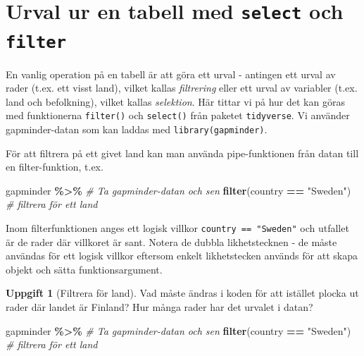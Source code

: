 \documentclass[
]{book}
\newenvironment{Shaded}{\begin{snugshade}}{\end{snugshade}}
\newcommand{\CommentTok}[1]{\textcolor[rgb]{0.56,0.35,0.01}{\textit{#1}}}
\newcommand{\FunctionTok}[1]{\textcolor[rgb]{0.13,0.29,0.53}{\textbf{#1}}}
\newcommand{\NormalTok}[1]{#1}
\newcommand{\SpecialCharTok}[1]{\textcolor[rgb]{0.81,0.36,0.00}{\textbf{#1}}}
\newcommand{\StringTok}[1]{\textcolor[rgb]{0.31,0.60,0.02}{#1}}
\theoremstyle{definition}
\theoremstyle{definition}
\theoremstyle{definition}
\newtheorem{exercise}{Uppgift}[chapter]
\theoremstyle{definition}
\theoremstyle{remark}
\begin{document}
\section{\texorpdfstring{Urval ur en tabell med \texttt{select} och \texttt{filter}}{Urval ur en tabell med select och filter}}\label{urval-ur-en-tabell-med-select-och-filter}

En vanlig operation på en tabell är att göra ett urval - antingen ett urval av rader (t.ex. ett visst land), vilket kallas \emph{filtrering} eller ett urval av variabler (t.ex. land och befolkning), vilket kallas \emph{selektion}. Här tittar vi på hur det kan göras med funktionerna \texttt{filter()} och \texttt{select()} från paketet \texttt{tidyverse}. Vi använder gapminder-datan som kan laddas med \texttt{library(gapminder)}.

För att filtrera på ett givet land kan man använda pipe-funktionen från datan till en filter-funktion, t.ex.

\begin{Shaded}
\begin{Highlighting}[]
\NormalTok{gapminder }\SpecialCharTok{\%\textgreater{}\%}                     \CommentTok{\# Ta gapminder{-}datan och sen}
  \FunctionTok{filter}\NormalTok{(country }\SpecialCharTok{==} \StringTok{"Sweden"}\NormalTok{)     }\CommentTok{\# filtrera för ett land}
\end{Highlighting}
\end{Shaded}

Inom filterfunktionen anges ett logisk villkor \texttt{country\ ==\ "Sweden"} och utfallet är de rader där villkoret är sant. Notera de dubbla likhetstecknen - de måste användas för ett logisk villkor eftersom enkelt likhetstecken används för att skapa objekt och sätta funktionsargument.

\begin{exercise}[Filtrera för land]

Vad måste ändras i koden för att istället plocka ut rader där landet är Finland? Hur många rader har det urvalet i datan?

\begin{Shaded}
\begin{Highlighting}[]
\NormalTok{gapminder }\SpecialCharTok{\%\textgreater{}\%}                     \CommentTok{\# Ta gapminder{-}datan och sen}
  \FunctionTok{filter}\NormalTok{(country }\SpecialCharTok{==} \StringTok{"Sweden"}\NormalTok{)     }\CommentTok{\# filtrera för ett land}
\end{Highlighting}
\end{Shaded}

\end{exercise}
\end{document}
